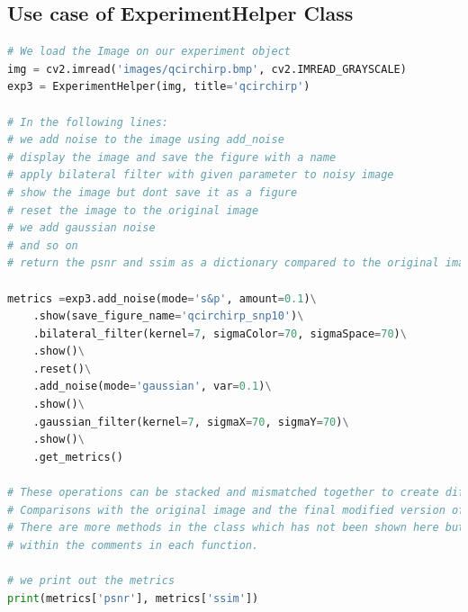 \documentclass[a4paper, english]{article}
\begin{document}
\subsection{Use case of ExperimentHelper Class}
\begin{lstlisting}[language=Python, caption=A sample use case of the class, label=experimentation_code_use]
# We load the Image on our experiment object
img = cv2.imread('images/qcirchirp.bmp', cv2.IMREAD_GRAYSCALE)
exp3 = ExperimentHelper(img, title='qcirchirp')

# In the following lines: 
# we add noise to the image using add_noise
# display the image and save the figure with a name
# apply bilateral filter with given parameter to noisy image
# show the image but dont save it as a figure
# reset the image to the original image
# we add gaussian noise 
# and so on
# return the psnr and ssim as a dictionary compared to the original image

metrics =exp3.add_noise(mode='s&p', amount=0.1)\
    .show(save_figure_name='qcirchirp_snp10')\
    .bilateral_filter(kernel=7, sigmaColor=70, sigmaSpace=70)\
    .show()\
    .reset()\
    .add_noise(mode='gaussian', var=0.1)\
    .show()\
    .gaussian_filter(kernel=7, sigmaX=70, sigmaY=70)\
    .show()\
    .get_metrics()

# These operations can be stacked and mismatched together to create different 
# Comparisons with the original image and the final modified version of the image.
# There are more methods in the class which has not been shown here but are described
# within the comments in each function.

# we print out the metrics
print(metrics['psnr'], metrics['ssim'])
\end{lstlisting}
\end{document}
